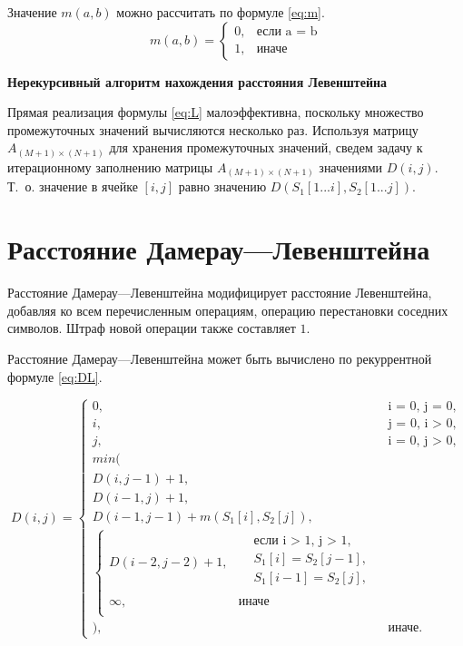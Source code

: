 Значение $ m(a, b) $ можно рассчитать по формуле \eqref{eq:m}.
\begin{equation}
	\label{eq:m}
	m(a, b) = \begin{cases}
		0, &\text{если a = b}\\
		1, &\text{иначе}
	\end{cases}
\end{equation}

\textbf{Нерекурсивный алгоритм нахождения расстояния Левенштейна}

Прямая реализация формулы \eqref{eq:L} малоэффективна, поскольку множество промежуточных значений вычисляются несколько раз. Используя матрицу $ A_{(M+1) \times (N+1)} $ для хранения промежуточных значений, сведем задачу к итерационному заполнению матрицы $ A_{(M+1) \times (N+1)} $ значениями $ D(i, j) $. Т.~о. значение в ячейке $ [i, j] $ равно значению $ D(S_1[1...i], S_2[1...j]) $.

\section{Расстояние Дамерау---Левенштейна}

Расстояние Дамерау---Левенштейна модифицирует расстояние Левенштейна, добавляя ко всем перечисленным операциям, операцию перестановки соседних символов. Штраф новой операции также составляет $ 1 $. 

Расстояние Дамерау---Левенштейна может быть вычислено по рекуррентной формуле \eqref{eq:DL}.

\begin{equation}
	\label{eq:DL}
	D(i, j) = 
	\begin{cases}
		0, &\text{i = 0, j = 0,}\\
		i, &\text{j = 0, i > 0,}\\
		j, &\text{i = 0, j > 0,}\\
		min(\\
		D(i, j - 1) + 1,\\
		D(i - 1, j) + 1,\\ 
		D(i - 1, j - 1) + m(S_{1}[i], S_{2}[j]), \\
		\begin{cases}
			D(i - 2, j - 2) + 1, & \begin{aligned}
				& \text{если i > 1, j > 1}, \\
				& S_{1}[i] = S_{2}[j - 1], \\
				& S_{1}[i - 1] = S_{2}[j], \\
			\end{aligned}\\
			\infty, & \textrm{иначе} \\
		\end{cases} \\
		), & \textrm{иначе.}
	\end{cases}
\end{equation}

